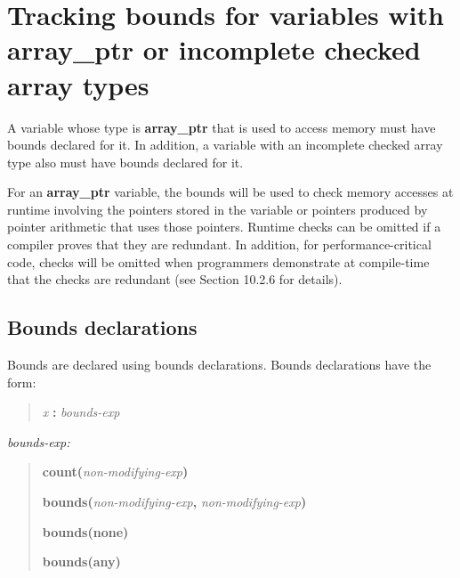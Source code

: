 \documentclass[]{article}
\begin{document}
\section{\texorpdfstring{\protect\hypertarget{ux5fToc435434926}{}{\protect\hypertarget{ux5fRef435693889}{}{\protect\hypertarget{ux5fRef435693921}{}{\protect\hypertarget{ux5fRef435795128}{}{\protect\hypertarget{ux5fToc437460747}{}{\protect\hypertarget{ux5fRef439941587}{}{\protect\hypertarget{ux5fRef439941625}{}{\protect\hypertarget{ux5fToc440445425}{}{\protect\hypertarget{ux5fToc440449207}{}{\protect\hypertarget{ux5fToc440551857}{}{}}}}}}}}}}Tracking
bounds for variables with array\_ptr or incomplete checked array
types}{Tracking bounds for variables with array\_ptr or incomplete checked array types}}\label{tracking-bounds-for-variables-with-arrayux5fptr-or-incomplete-checked-array-types}

A variable whose type is \textbf{array\_ptr} that is used to access
memory must have bounds declared for it. In addition, a variable with an
incomplete checked array type also must have bounds declared for it.

For an \textbf{array\_ptr} variable, the bounds will be used to check
memory accesses at runtime involving the pointers stored in the variable
or pointers produced by pointer arithmetic that uses those pointers.
Runtime checks can be omitted if a compiler proves that they are
redundant. In addition, for performance-critical code, checks will be
omitted when programmers demonstrate at compile-time that the checks are
redundant (see Section 10.2.6 for details).

\subsection{\texorpdfstring{\protect\hypertarget{ux5fRef435099305}{}{\protect\hypertarget{ux5fToc435434927}{}{\protect\hypertarget{ux5fToc437460748}{}{\protect\hypertarget{ux5fToc440445426}{}{\protect\hypertarget{ux5fToc440449208}{}{\protect\hypertarget{ux5fToc440551858}{}{}}}}}}Bounds
declarations}{Bounds declarations}}\label{bounds-declarations}

Bounds are declared using bounds declarations. Bounds declarations have
the form:

\begin{quote}
\emph{x} \textbf{:} \emph{bounds-exp}
\end{quote}

\emph{bounds-exp:}

\begin{quote}
\textbf{count(}\emph{non-modifying-exp}\textbf{)}

\textbf{bounds(}\emph{non-modifying-exp}\textbf{,}
\emph{non-modifying-exp}\textbf{)}

\textbf{bounds(none)}

\textbf{bounds(any)}
\end{quote}
\end{document}

